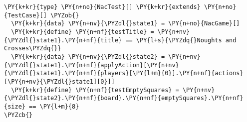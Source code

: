 \begin{Verbatim}[commandchars=\\\{\}]
\PY{k+kr}{type} \PY{n+no}{NacTest}[] \PY{k+kr}{extends} \PY{n+no}{TestCase}[] \PYZob{}
  \PY{k+kr}{data} \PY{n+nv}{\PYZdl{}state1} = \PY{n+no}{NacGame}[]
  \PY{k+kr}{define} \PY{n+nf}{testTitle} = \PY{n+nv}{\PYZdl{}state1}.\PY{n+nf}{title} == \PY{l+s}{\PYZdq{}Noughts and Crosses\PYZdq{}}
  \PY{k+kr}{data} \PY{n+nv}{\PYZdl{}state2} = \PY{n+nv}{\PYZdl{}state1}.\PY{n+nf}{applyAction}[\PY{n+nv}{\PYZdl{}state1}.\PY{n+nf}{players}[\PY{l+m}{0}].\PY{n+nf}{actions}[\PY{n+nv}{\PYZdl{}state1][0}]]
  \PY{k+kr}{define} \PY{n+nf}{testEmptySquares} = \PY{n+nv}{\PYZdl{}state2}.\PY{n+nf}{board}.\PY{n+nf}{emptySquares}.\PY{n+nf}{size} == \PY{l+m}{8}
\PYZcb{}
\end{Verbatim}
